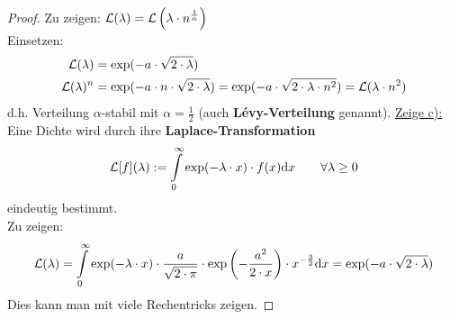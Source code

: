 \begin{proof}
	Zu zeigen: $\mathcal{L}(\lambda)=\mathcal{L}\left(\lambda\cdot n^{\frac{1}{\alpha}}\right)$\\
	Einsetzen:
	\begin{align*}
		\mathcal{L}(\lambda)&=\exp(-a\cdot\sqrt{2\cdot\lambda})\\
		\mathcal{L}(\lambda)^n&=\exp(-a\cdot n\cdot\sqrt{2\cdot\lambda})
		=\exp(-a\cdot \sqrt{2\cdot\lambda\cdot n^2})
		=\mathcal{L}(\lambda\cdot n^2)
	\end{align*}
	d.h. Verteilung $\alpha$-stabil mit $\alpha=\frac{1}{2}$ (auch \textbf{Lévy-Verteilung} genannt).\nl
	\underline{Zeige c):}\\
	Eine Dichte wird durch ihre \textbf{Laplace-Transformation}
	\begin{align*}
		\mathcal{L}[f](\lambda):=\int\limits_0^\infty\exp(-\lambda\cdot x)\cdot f(x)\mathrm{d} x\qquad\forall\lambda\geq0
	\end{align*}
	eindeutig bestimmt.\\
	Zu zeigen:
	\begin{align*}
		\mathcal{L}(\lambda)=\int\limits_0^\infty\exp(-\lambda\cdot x)\cdot\frac{a}{\sqrt{2\cdot\pi}}\cdot\exp\left(-\frac{a^2}{2\cdot x}\right)\cdot x^{-\frac{3}{2}}\mathrm{d} x=\exp(-a\cdot\sqrt{2\cdot\lambda})
	\end{align*}
	Dies kann man mit viele Rechentricks zeigen. 
\end{proof}